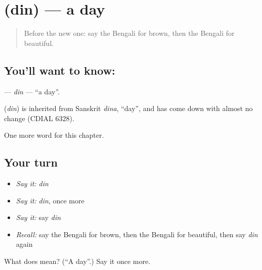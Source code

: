 \section[\texorpdfstring{\bn{দিন} (din)}{দিন (din)}]{ (din) — a day}

\label{lesson:BN-C77-din}



\begin{quote}
Before the new one: say the Bengali for brown, then the Bengali for beautiful.
\end{quote}

\subsection*{You'll want to know: }
\textbf{} — \emph{din} — \textquotedblleft{}a day\textquotedblright{}.

\begin{cousinweb}
\textbf{} (\emph{din}) is inherited from Sanskrit \emph{dina}, \textquotedblleft{}day\textquotedblright{}, and has come down with almost no change (CDIAL 6328).
\end{cousinweb}

\begin{grammarlens}[title={What you've built}]
One more word for this chapter.
\end{grammarlens}

\subsection*{Your turn}
\begin{itemize}
\raggedright
  \item \emph{Say it:} \emph{din}
  \item \emph{Say it:} \emph{din}, once more
  \item \emph{Say it:} say \emph{din}
  \item \emph{Recall:} say the Bengali for brown, then the Bengali for beautiful, then say \emph{din} again
\end{itemize}

\begin{tcolorbox}[breakable,colback=teal!4,colframe=teal!35!black,title={Before you move on}]
What does  mean? (\textquotedblleft{}A day\textquotedblright{}.) Say it once more.
\end{tcolorbox}
